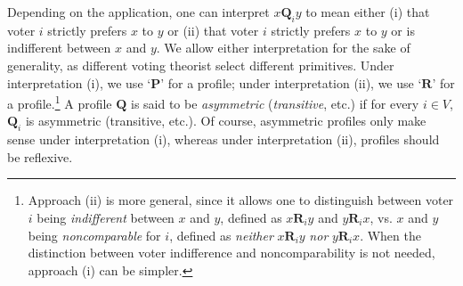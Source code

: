 \documentclass[runningheads]{llncs}
\begin{document}





Depending on the application, one can interpret $x\mathbf{Q}_i y$ to mean either (i) that voter $i$ strictly prefers $x$ to $y$ or (ii) that voter $i$ strictly prefers $x$ to $y$ or is indifferent between $x$ and $y$. We allow either interpretation for the sake of generality, as different voting theorist select different primitives. Under interpretation (i), we use `$\mathbf{P}$' for a profile; under interpretation (ii), we use `$\mathbf{R}$' for a profile.\footnote{\label{VoterNote}Approach (ii) is more general, since it allows one to distinguish between voter $i$ being \textit{indifferent} between $x$ and $y$, defined as $x\mathbf{R}_iy$ and $y\mathbf{R}_ix$, vs. $x$ and $y$ being \textit{noncomparable} for $i$, defined as \textit{neither} $x\mathbf{R}_iy$ \textit{nor} $y\mathbf{R}_ix$. When the distinction between voter indifference and noncomparability is not needed, approach (i) can be simpler.} A profile $\mathbf{Q}$ is said to be \emph{asymmetric} (\emph{transitive}, etc.) if for every $i\in V$, $\mathbf{Q}_i$ is asymmetric (transitive, etc.). Of course, asymmetric profiles only make sense under interpretation (i), whereas under interpretation (ii), profiles should be reflexive.
\end{document}
